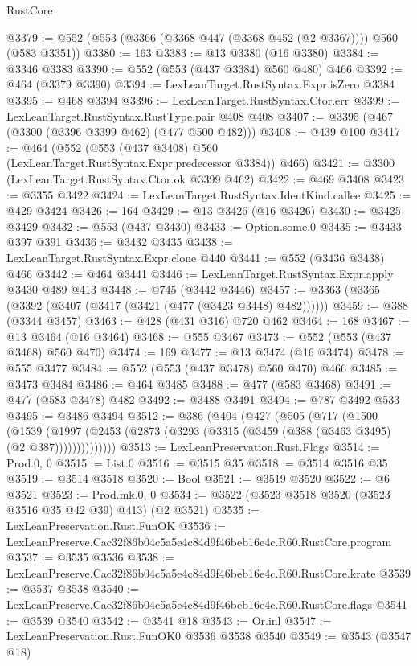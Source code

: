 \begin{lexlean}{RustCore}
\begin{coremodule}
@3379 := @552 (@553 (@3366 (@3368 @447 (@3368 @452 (@2 @3367)))) @560 (@583 @3351))
@3380 := 163
@3383 := @13 @3380 (@16 @3380)
@3384 := @3346 @3383
@3390 := @552 (@553 (@437 @3384) @560 @480) @466
@3392 := @464 (@3379 @3390)
@3394 := LexLeanTarget.RustSyntax.Expr.isZero @3384
@3395 := @468 @3394
@3396 := LexLeanTarget.RustSyntax.Ctor.err
@3399 := LexLeanTarget.RustSyntax.RustType.pair @408 @408
@3407 := @3395 (@467 (@3300 (@3396 @3399 @462) (@477 @500 @482)))
@3408 := @439 @100
@3417 := @464 (@552 (@553 (@437 @3408) @560 (LexLeanTarget.RustSyntax.Expr.predecessor @3384)) @466)
@3421 := @3300 (LexLeanTarget.RustSyntax.Ctor.ok @3399 @462)
@3422 := @469 @3408
@3423 := @3355 @3422
@3424 := LexLeanTarget.RustSyntax.IdentKind.callee
@3425 := @429 @3424
@3426 := 164
@3429 := @13 @3426 (@16 @3426)
@3430 := @3425 @3429
@3432 := @553 (@437 @3430)
@3433 := Option.some.{0}
@3435 := @3433 @397 @391
@3436 := @3432 @3435
@3438 := LexLeanTarget.RustSyntax.Expr.clone @440
@3441 := @552 (@3436 @3438) @466
@3442 := @464 @3441
@3446 := LexLeanTarget.RustSyntax.Expr.apply @3430 @489 @413
@3448 := @745 (@3442 @3446)
@3457 := @3363 (@3365 (@3392 (@3407 (@3417 (@3421 (@477 (@3423 @3448) @482))))))
@3459 := @388 (@3344 @3457)
@3463 := @428 (@431 @316) @720 @462
@3464 := 168
@3467 := @13 @3464 (@16 @3464)
@3468 := @555 @3467
@3473 := @552 (@553 (@437 @3468) @560 @470)
@3474 := 169
@3477 := @13 @3474 (@16 @3474)
@3478 := @555 @3477
@3484 := @552 (@553 (@437 @3478) @560 @470) @466
@3485 := @3473 @3484
@3486 := @464 @3485
@3488 := @477 (@583 @3468)
@3491 := @477 (@583 @3478) @482
@3492 := @3488 @3491
@3494 := @787 @3492 @533
@3495 := @3486 @3494
@3512 := @386
    (@404
      (@427
        (@505
          (@717
            (@1500
              (@1539
                (@1997 (@2453 (@2873 (@3293 (@3315 (@3459 (@388 (@3463 @3495) (@2 @387))))))))))))))
@3513 := LexLeanPreservation.Rust.Flags
@3514 := Prod.{0, 0}
@3515 := List.{0}
@3516 := @3515 @35
@3518 := @3514 @3516 @35
@3519 := @3514 @3518
@3520 := Bool
@3521 := @3519 @3520
@3522 := @6 @3521
@3523 := Prod.mk.{0, 0}
@3534 := @3522 (@3523 @3518 @3520 (@3523 @3516 @35 @42 @39) @413) (@2 @3521)
@3535 := LexLeanPreservation.Rust.FunOK
@3536 := LexLeanPreserve.Cac32f86b04c5a5e4c84d9f46beb16e4c.R60.RustCore.program
@3537 := @3535 @3536
@3538 := LexLeanPreserve.Cac32f86b04c5a5e4c84d9f46beb16e4c.R60.RustCore.krate
@3539 := @3537 @3538
@3540 := LexLeanPreserve.Cac32f86b04c5a5e4c84d9f46beb16e4c.R60.RustCore.flags
@3541 := @3539 @3540
@3542 := @3541 @18
@3543 := Or.inl
@3547 := LexLeanPreservation.Rust.FunOK0 @3536 @3538 @3540
@3549 := @3543 (@3547 @18)

\end{coremodule}
\end{lexlean}
